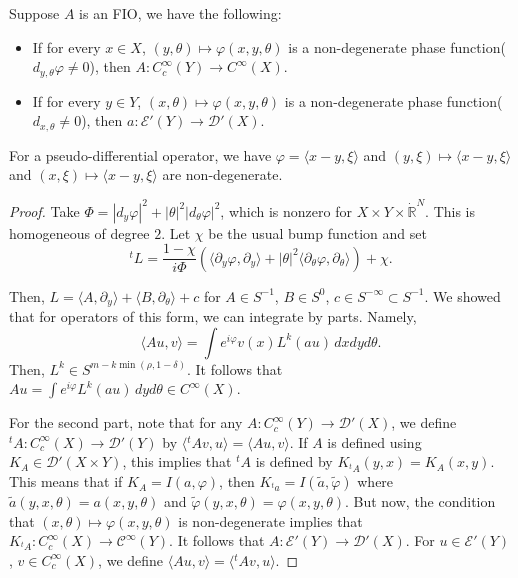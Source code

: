 \documentclass[12pt]{scrartcl}
\newcommand{\R}{\mathbb{R}}
\newcommand{\<}{\langle}
\renewcommand{\>}{\rangle}
\let \phi \varphi
\let \mc \mathcal
\let \p \partial
\begin{document}
\begin{theorem}
Suppose $A$ is an FIO, we have the following:
\begin{itemize}
\item If for every $x \in X$, $(y, \theta) \mapsto \phi(x, y, \theta)$ is a non-degenerate phase function($d_{y, \theta}\phi \ne 0$), then $A: C_c^\infty(Y) \to C^\infty(X)$.
\item If for every $y \in Y$, $(x, \theta) \mapsto \phi(x, y, \theta)$ is a non-degenerate phase function($d_{x, \theta} \ne 0$), then $a: \mc E'(Y) \to \mc D'(X)$.
\end{itemize}
\end{theorem}
\begin{example} For a pseudo-differential operator, we have $\phi = \<x - y, \xi\>$ and $(y, \xi) \mapsto \<x-y, \xi\>$ and $(x, \xi) \mapsto \<x-y, \xi\>$ are non-degenerate.  
\end{example}
\begin{proof}
Take $\Phi = |d_y\phi|^2 + |\theta|^2 |d_\theta \phi|^2$, which is nonzero for $X \times Y \times \dot{\R}^N$.  This is homogeneous of degree $2$.  Let $\chi$ be the usual bump function and set $${}^t L = \frac{1 - \chi}{i\Phi}(\<\partial_y \phi, \partial_y\> +|\theta|^2 \<\partial_\theta \phi, \partial_\theta\>) + \chi.$$

Then, $L = \<A, \p_y\> + \<B, \p_\theta\> + c$ for $A \in S^{-1}$, $B \in S^{0}$, $c \in S^{-\infty} \subset S^{-1}$.  We showed that for operators of this form, we can integrate by parts.  Namely,
$$\<Au, v\> = \int e^{i\phi} v(x) L^k(au) \,dxdyd\theta.$$
Then, $L^k \in S^{m - k\min(\rho, 1-\delta)}$.  It follows that $Au = \int e^{i\phi} L^k(au) \,dy d\theta \in C^\infty(X)$.

For the second part, note that for any $A: C_c^\infty(Y) \to \mc D'(X)$, we define ${}^tA: C_c^\infty(X) \to \mc D'(Y)$ by $\<{}^t A v, u\> = \<Au, v\>.$  If $A$ is defined using $K_A \in \mc D'(X \times Y)$, this implies that ${}^tA$ is defined by $K_{{}^tA}(y, x) = K_A(x, y)$.  This means that if $K_A = I(a, \phi)$, then $K_{{}^t a} = I(\tilde{a}, \tilde{\phi})$ where $\tilde{a}(y, x, \theta) = a(x, y, \theta)$ and $\tilde{\phi}(y, x, \theta) = \phi(x, y, \theta)$.  But now, the condition that $(x, \theta) \mapsto \phi(x, y, \theta)$ is non-degenerate implies that $K_{{}^t A} : C_c^\infty(X) \to \mc C^\infty(Y)$.   It follows that $A: \mc E'(Y) \to \mc D'(X)$.  For $u \in \mc E'(Y)$, $v \in C_c^\infty(X)$, we define $\<Au, v\> = \<{}^t A v, u\>$.

\end{proof}
\end{document}
